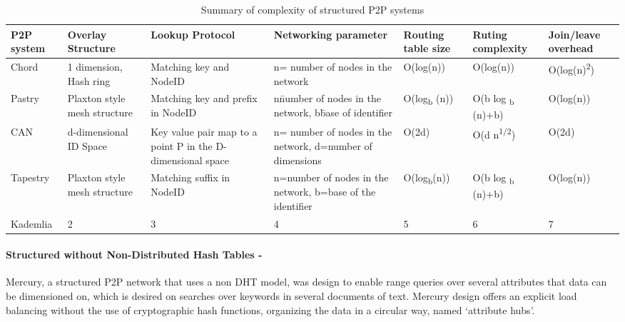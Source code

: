 \documentclass{./llncs2e/llncs}
\begin{document}
\begin{table}
  \begin{tabular}{| p{1.4cm} | p{1.9cm} | p{2cm} | p{2.5cm} | p{1.6cm} | p{1.8cm} | p{1.8cm} |}
    \hline                        
    \textbf{P2P system} & \textbf{Overlay Structure} & \textbf{Lookup Protocol} & \textbf{Networking parameter} & \textbf{Routing table size} & \textbf{Ruting complexity} & \textbf{Join/leave overhead} \\
    
    \hline
    Chord & 1 dimension, Hash ring & Matching key and NodeID & n= number of nodes in the network & O(log(n)) & O(log(n)) & O(log(n)\textsuperscript{2}) \\
    
    \hline
    Pastry & Plaxton style mesh structure & Matching key and prefix in NodeID & n\= number of nodes in the network, b\=base of identifier & O(log\textsubscript{b} (n)) & O(b log \textsubscript{b} (n)+b) & O(log(n)) \\
    
    \hline
    CAN & d-dimensional ID Space & Key value pair map to a point P in the D-dimensional space & n= number of nodes in the network, d=number of dimensions & O(2d) & O(d n\textsuperscript{1/2}) & O(2d) \\
    
    \hline
    Tapestry & Plaxton style mesh structure & Matching suffix in NodeID & n=number of nodes in the network, b=base of the identifier & O(log\textsubscript{b}(n)) & O(b log \textsubscript{b} (n)+b) & O(log(n)) \\
    
    \hline  
    Kademlia & 2 & 3 & 4 & 5 & 6 & 7 \\
    \hline      
  \end{tabular}
  \caption{Summary of complexity of structured P2P systems}
  \label{table:Complexity of structured P2P systems using a DHT}
\end{table}


\paragraph{\textbf{Structured without Non-Distributed Hash Tables -}} %
\label{par:Structured without Non-Distributed Hash Tables}

Mercury\cite{Bharambe}, a structured P2P network that uses a non DHT model, was design to enable range queries over several attributes that data can be dimensioned on, which is desired on searches over keywords in several documents of text. Mercury design offers an explicit load balancing without the use of cryptographic hash functions, organizing the data in a circular way, named `attribute hubs'.
\end{document}
